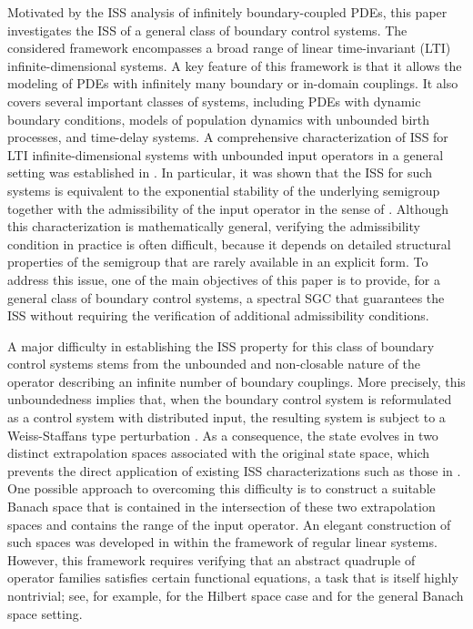 \documentclass[onecolumn]{autart}
\numberwithin{equation}{section}
\begin{document}
    Motivated by the ISS analysis of  infinitely boundary-coupled PDEs, this paper investigates the ISS of a general class of boundary control systems.  The considered framework encompasses a broad range of linear time-invariant (LTI) infinite-dimensional systems. A key feature of {this} framework is that it allows the modeling of PDEs with infinitely many boundary or in-domain couplings. It also covers several important classes of systems, including PDEs with dynamic boundary conditions, models of population dynamics with unbounded birth processes, and time-delay systems.
    A comprehensive characterization of ISS for LTI infinite-dimensional systems with unbounded input operators in a general setting was established in \cite{JaNPS}. In particular, it was shown that the ISS for such systems is equivalent to the exponential stability of the underlying semigroup together with the admissibility of the input operator in the sense of \cite{WC}. Although this characterization is mathematically general, verifying the admissibility condition in practice is often difficult, {because} it depends on detailed structural properties of the semigroup that are rarely available in an explicit form. {To address this issue,} one of the main objectives of this paper is to provide, for a general class of boundary control systems, a spectral SGC that guarantees the ISS without requiring the verification of additional admissibility conditions.

    A major difficulty in establishing the ISS property for this class of boundary control systems stems from the unbounded and non-closable nature of the operator describing an infinite number of boundary couplings. More precisely, this unboundedness implies that, when the boundary control system is reformulated as a control system with distributed input, the resulting system is subject to a Weiss-Staffans type perturbation \cite{WF,Staffans}. As a consequence, the state evolves in two distinct extrapolation spaces associated with the original state space, which prevents the direct application of existing ISS characterizations such as those in \cite{JaNPS}. One possible approach to overcoming this difficulty is to construct a suitable Banach space that is contained in the intersection of these two extrapolation spaces and contains the range of the input operator. An elegant construction of such spaces was developed in \cite{WF} within the framework of regular linear systems. However, this framework requires verifying that an abstract quadruple of operator families satisfies certain functional equations, a task that is itself highly nontrivial; see, for example, \cite{WF} for the Hilbert space case and \cite[Chap.~7]{Staffans} for the general Banach space setting.
\end{document}
